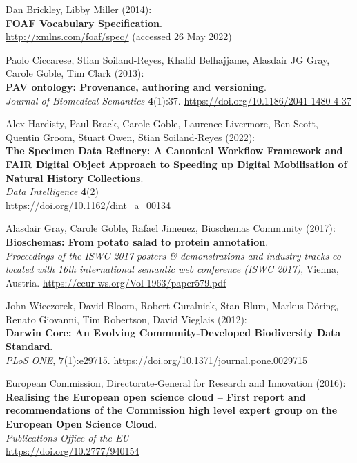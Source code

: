 \begin{thebibliography}{9}
Dan Brickley, Libby Miller (2014): \\
\textbf{FOAF Vocabulary Specification}.\\
\url{http://xmlns.com/foaf/spec/} (accessed 26 May 2022)

Paolo Ciccarese, Stian Soiland-Reyes, Khalid Belhajjame, Alasdair JG
Gray, Carole Goble, Tim Clark (2013): \\
\textbf{PAV ontology: Provenance, authoring and versioning}. \\
\emph{Journal of Biomedical Semantics} \textbf{4}(1):37.
\url{https://doi.org/10.1186/2041-1480-4-37}

Alex Hardisty, Paul Brack, Carole Goble, Laurence Livermore, Ben Scott,
Quentin Groom, Stuart Owen, Stian Soiland-Reyes (2022): \\
\textbf{The Specimen Data Refinery: A Canonical Workflow Framework and FAIR Digital Object Approach to Speeding up Digital Mobilisation of Natural History Collections}. \\
\emph{Data Intelligence} \textbf{4}(2)\\
\url{https://doi.org/10.1162/dint_a_00134}

Alasdair Gray, Carole Goble, Rafael Jimenez, Bioschemas Community
(2017): \\
\textbf{Bioschemas: From potato salad to protein annotation}.\\
\emph{Proceedings of the ISWC 2017 posters \& demonstrations and
industry tracks co-located with 16th international semantic web
conference (ISWC 2017)}, Vienna, Austria.
\url{https://ceur-ws.org/Vol-1963/paper579.pdf}

John Wieczorek, David Bloom, Robert Guralnick, Stan Blum, Markus Döring,
Renato Giovanni, Tim Robertson, David Vieglais (2012): \\
\textbf{Darwin {Core}: {An Evolving Community-Developed Biodiversity Data Standard}}.\\
\emph{PLoS ONE}, \textbf{7}(1):e29715.
\url{https://doi.org/10.1371/journal.pone.0029715}

European Commission, Directorate-General for Research and Innovation (2016): \\ 
\textbf{Realising the European open science cloud – First report and recommendations of the Commission high level expert group on the European Open Science Cloud}. \\
\emph{Publications Office of the EU} \\
\url{https://doi.org/10.2777/940154}


\end{thebibliography}
